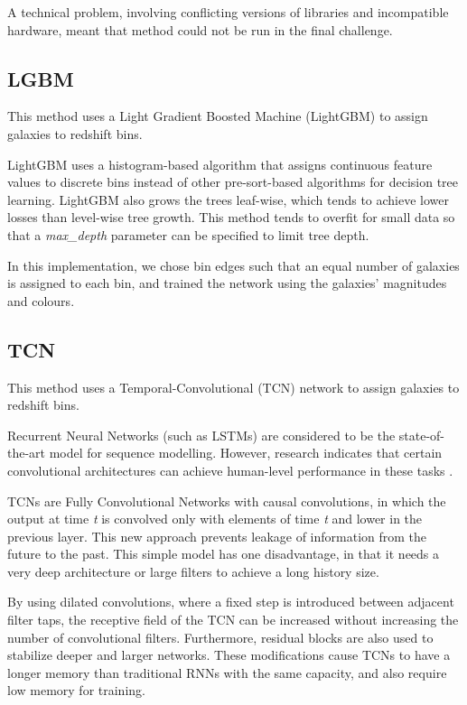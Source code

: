 \documentclass[twocolumn,twocolappendix]{aastex63}
\begin{document}
A technical problem, involving conflicting versions of libraries and incompatible hardware,
meant that method could not be run in the final challenge.


\subsection{ {\sc LGBM} }
This method uses a Light Gradient Boosted Machine (LightGBM) \citep{lgbm} to assign galaxies to
redshift bins.
 
LightGBM uses a histogram-based algorithm that assigns continuous feature values to discrete bins
instead of other pre-sort-based algorithms for decision tree learning. LightGBM also grows the trees
leaf-wise, which tends to achieve lower losses than level-wise tree growth. This method tends to
overfit for small data so that a \textit{max\_depth} parameter can be specified to limit tree depth.

 
In this implementation, we chose bin edges such that an equal number of galaxies is assigned to each
bin, and trained the network using the galaxies' magnitudes and colours.

 
\subsection{ {\sc TCN}}
This method uses a Temporal-Convolutional (TCN) \citep{baitcn} network to assign galaxies to redshift
bins.
 
Recurrent Neural Networks (such as LSTMs) are considered to be the state-of-the-art model for
sequence modelling. However, research indicates that certain convolutional architectures can achieve
human-level performance in these tasks \citep{dauphin}.
 
TCNs are Fully Convolutional Networks with causal convolutions, in which the output at time
\textit{t} is convolved only with elements of time \textit{t} and lower in the previous layer. This
new approach prevents leakage of information from the future to the past. This simple model has one
disadvantage, in that it needs a very deep architecture or large filters to achieve a long history
size. 
 
By using dilated convolutions, where a fixed step is introduced between adjacent filter taps, the
receptive field of the TCN can be increased without increasing the number of convolutional filters.
Furthermore, residual blocks \citep{resnet} are also used to stabilize deeper and larger networks. These
modifications cause TCNs to have a longer memory than traditional RNNs with the same capacity,  and
also require low memory for training.
 
\end{document}

